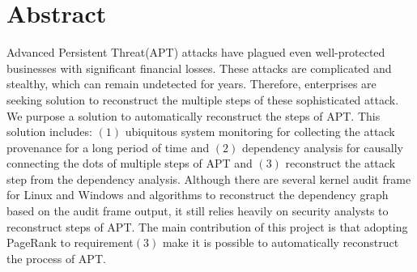 \section{Abstract}
Advanced Persistent Threat(APT) attacks have plagued even well-protected businesses with significant financial losses. These attacks are complicated and stealthy, which can remain undetected for years. Therefore, enterprises are seeking solution to reconstruct the multiple steps of these sophisticated attack. We purpose a solution to automatically reconstruct the steps of APT. This solution includes: $\left(1\right)$ ubiquitous system monitoring for collecting the attack provenance for a long period of time and $\left(2\right)$ dependency analysis for causally connecting the dots of multiple steps of APT and $\left(3\right)$ reconstruct the attack step from the dependency analysis. Although there are several kernel audit frame for Linux and Windows and algorithms to reconstruct the dependency graph based on the audit frame output, it still relies heavily on security analysts to reconstruct steps of APT. The main contribution of this project is that adopting PageRank to requirement$\left(3\right)$ make it is possible to automatically reconstruct the process of APT.

